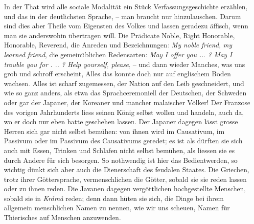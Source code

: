 In der That wird alle sociale Modalität ein Stück Verfassungsgeschichte erzählen, und das in der deutlichsten Sprache, – man braucht nur hinzulauschen. Darum sind dies aber Theile vom Eigensten des Volkes und lassen geradezu äffisch, wenn man sie anderswohin übertragen will. Die Prädicate Noble, Right Honorable, Honorable, Reverend, die Anreden und Bezeichnungen: \textit{My noble friend}, \textit{my learned friend}, die gemeinüblichen Redensarten: \textit{May I offer you ... ? May I trouble you for . .. ? Help yourself, please}, – und dann wieder \label{sp.475} Manches, was uns grob und schroff erscheint, Alles das konnte doch nur auf englischem Boden wachsen. Alles ist scharf zugemessen, der Nation auf den Leib geschneidert, und wie so ganz anders, als etwa das Sprachceremoniell der Deutschen, der Schweden oder gar der Japaner, der Koreaner und mancher malaischer Völker! Der Franzose des vorigen Jahrhunderts liess seinen König selbst wollen und handeln, auch da, wo er doch nur eben hatte geschehen lassen. Der Japaner dagegen lässt grosse Herren sich gar nicht selbst bemühen: von ihnen wird im Causativum, im Passivum oder im Passivum des Causativums geredet; es ist als dürften sie sich auch mit Essen, Trinken und Schlafen nicht selbst bemühen, als liessen sie es durch Andere für sich besorgen.  So nothwendig ist hier das Bedientwerden, so wichtig dünkt sich aber auch die Dienerschaft des feudalen Staates. Die Griechen, trotz ihrer Göttersprache, \label{fp.457} vermenschlichen die Götter, sobald sie sie reden lassen oder zu ihnen reden.  Die Javanen dagegen vergöttlichen hochgestellte Menschen, sobald sie in \textit{Kråmå} reden; denn dann hüten sie sich, die Dinge bei ihrem allgemein menschlichen Namen zu nennen, wie wir uns scheuen, Namen für Thierisches auf Menschen anzuwenden.

\clearpage{}
\subsection*{}

